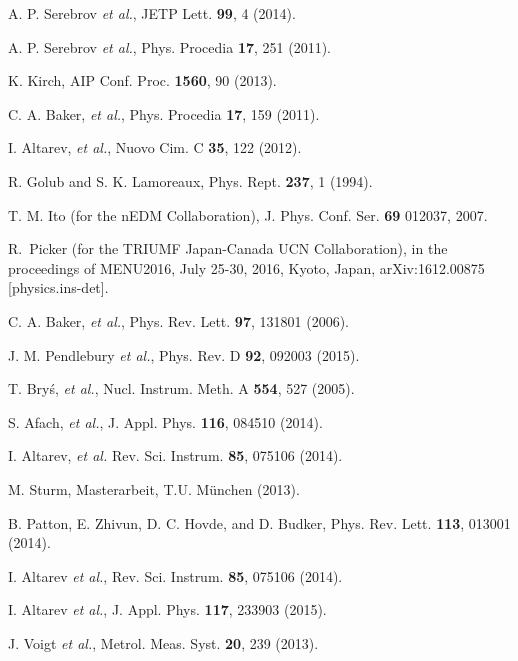 \documentclass[review,number,sort&compress]{elsarticle}
\begin{document}

\begin{thebibliography}{00}

 A. P. Serebrov {\it et al.}, JETP Lett. {\bf 99}, 4
  (2014).

 A. P. Serebrov {\it et al.}, Phys. Procedia {\bf
  17}, 251 (2011).

 K. Kirch, AIP Conf. Proc. {\bf 1560}, 90 (2013).

 C. A. Baker, {\it et al.}, Phys. Procedia {\bf
  17}, 159 (2011).

 I. Altarev, {\it et al.}, Nuovo Cim. C {\bf
  35}, 122 (2012).

 R. Golub and S. K. Lamoreaux, Phys. Rept.  {\bf
  237}, 1 (1994).

 T. M. Ito (for the nEDM Collaboration),
  J. Phys. Conf. Ser. {\bf 69} 012037, 2007.

 R.~Picker (for the TRIUMF Japan-Canada UCN
  Collaboration), in the proceedings of MENU2016, July 25-30, 2016,
  Kyoto, Japan, arXiv:1612.00875 [physics.ins-det].

 C. A. Baker, {\it et al.}, Phys. Rev. Lett. {\bf
  97}, 131801 (2006).

 J. M. Pendlebury {\it et al.}, Phys. Rev. D
  {\bf 92}, 092003 (2015).

 T. Bry\'s, {\it et al.}, Nucl. Instrum. Meth. A
  {\bf 554}, 527 (2005).

 S. Afach, {\it et al.}, J. Appl. Phys. {\bf 116},
  084510 (2014).

 I. Altarev, {\it et al.}
  Rev. Sci. Instrum. {\bf 85}, 075106 (2014).

 M. Sturm, Masterarbeit, T.U. M\"unchen
  (2013).

 B. Patton, E. Zhivun, D. C. Hovde, and D. Budker,
  Phys. Rev. Lett. {\bf 113}, 013001 (2014).


 I. Altarev {\it et al.},
  Rev. Sci. Instrum. {\bf 85}, 075106 (2014).


 I. Altarev {\it et al.}, J. Appl. Phys. {\bf 117}, 233903 (2015).



 J. Voigt {\it et al.}, Metrol. Meas. Syst. {\bf 20}, 239 (2013).


\end{thebibliography}
\end{document}
